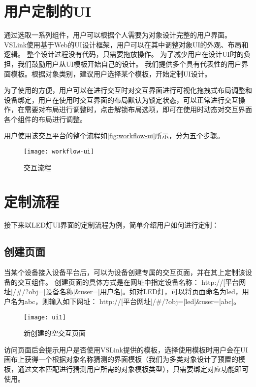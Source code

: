 \section{用户定制的UI}
通过选取一系列组件，用户可以根据个人需要为对象设计完整的用户界面。
VSLink使用基于Web的UI设计框架，用户可以在其中调整对象UI的外观、布局和逻辑。
整个设计过程没有代码，只需要拖放操作。
为了减少用户在设计UI时的负担，我们鼓励用户从UI模板开始自己的设计。
我们提供多个具有代表性的用户界面模板。根据对象类别，建议用户选择某个模板，开始定制UI设计。

为了使用的方便，用户可以在进行交互时对交互界面进行可视化拖拽式布局调整和设备绑定，用户在使用时交互界面的布局默认为锁定状态，可以正常进行交互操作，在需要对布局进行调整时，点击解锁布局选项，即可在使用时动态对交互界面各个组件的布局进行调整。

用户使用该交互平台的整个流程如\autoref{fig:workflow-ui}所示，分为五个步骤。

\begin{figure}[htbp]
	\centering
	\texttt{[image: workflow-ui]}
	\caption{交互流程}
	\label{fig:workflow-ui}
\end{figure}

\section{定制流程}
接下来以LED灯UI界面的定制流程为例，简单介绍用户如何进行定制：
\subsection{创建页面}
当某个设备接入设备平台后，可以为设备创建专属的交互页面，并在其上定制该设备的交互组件。
创建页面的具体方式是在网址中指定设备名称：
http://[平台网址]/\#/?obj=[设备名称]\&user=[用户名]。如对LED灯，可以将页面命名为led，用户名为abc，则输入如下网址：
http://[平台网址]/\#/?obj=[led]\&user=[abc]。

\begin{figure}[htbp]
	\centering
	\texttt{[image: ui1]}
	\caption{新创建的空交互页面}
	\label{fig:ui1}
\end{figure}

访问页面后会提示用户是否使用VSLink提供的模板，选择使用模板时用户会在UI画布上获得一个根据对象名称猜测的界面模板（我们为多类对象设计了预置的模板，通过文本匹配进行猜测用户所需的对象模板类型），只需要绑定对应功能即可使用。

